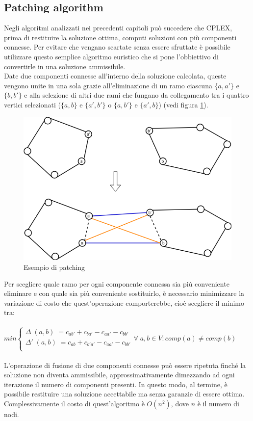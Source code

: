 \subsection{Patching algorithm}
Negli algoritmi analizzati nei precedenti capitoli può succedere che CPLEX, prima di restituire la soluzione ottima, computi soluzioni con più componenti connesse. Per evitare che vengano scartate senza essere sfruttate   è possibile utilizzare questo semplice algoritmo euristico che si pone l'obbiettivo di convertirle in una soluzione ammissibile.\\
Date due componenti connesse all'interno della soluzione calcolata, queste vengono unite in una sola grazie all'eliminazione di un ramo ciascuna $\{a, a'\}$ e  $\{b, b'\}$ e alla selezione di altri due rami che fungano da collegamento tra i quattro vertici selezionati ($\{a, b\}$ e $\{a', b'\}$ o $\{a, b'\}$ e $\{a', b\}$) (vedi figura \ref{patching}). 
\begin{figure}[h] 
\begin{center} 
  \includegraphics[scale=0.38]{Images/patching}
  \caption{\footnotesize{Esempio di patching}} \label{patching} 
\end{center} 
\end{figure}
Per scegliere quale ramo per ogni componente connessa sia più conveniente eliminare e con quale sia più conveniente sostituirlo, è necessario minimizzare la variazione di costo che quest'operazione comporterebbe, cioè scegliere il minimo tra: \\\\
$min \begin{cases}
\Delta \;(a,b)\;=c_{ab'} + c_{ba'} - c_{aa'} - c_{bb'}\\ 
\Delta' \;(a,b)\;=c_{ab} + c_{b'a'} - c_{aa'} - c_{bb'}\\ 
\end{cases}
\forall \; a,b \in V : comp(a)\neq comp(b)$
\\\\L'operazione di fusione di due componenti connesse può essere ripetuta finché la soluzione non diventa ammissibile, approssimativamente dimezzando ad ogni iterazione il numero di componenti presenti. In questo modo, al termine, è possibile restituire una soluzione accettabile ma senza garanzie di essere ottima.\\
Complessivamente il costo di quest'algoritmo è $O(n^2)$, dove $n$ è il numero di nodi.